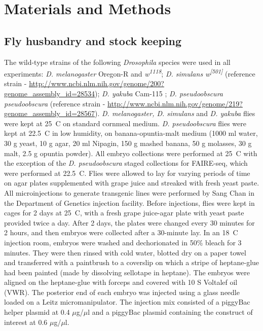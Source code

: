 \chapter{Materials and Methods}

\hrulefill

\section{Fly husbandry and stock keeping}
The wild-type strains of the following \emph{Drosophila} species were used in all experiments: \emph{D. melanogaster} Oregon-R and \emph{w\textsuperscript{1118}}; \emph{D. simulans w\textsuperscript{[501]}} (reference strain - \url{http://www.ncbi.nlm.nih.gov/genome/200?genome_assembly_id=28534}); \emph{D. yakuba} Cam-115 \citep{coyne_genetic_2004}; \emph{D. pseudoobscura pseudoobscura} (reference strain - \url{http://www.ncbi.nlm.nih.gov/genome/219?genome_assembly_id=28567}). \emph{D. melanogaster, D. simulans} and \emph{D. yakuba} flies were kept at 25\degree~C on standard cornmeal medium. \emph{D. pseudoobscura} flies were kept at 22.5\degree~C in low humidity, on banana-opuntia-malt medium (1000 ml water, 30 g yeast, 10 g agar, 20 ml Nipagin, 150 g mashed banana, 50 g molasses, 30 g malt, 2.5 g opuntia powder). All embryo collections were performed at 25\degree~C with the exception of the \emph{D. pseudoobscura} staged collections for FAIRE-seq, which were performed at 22.5\degree~C. Flies were allowed to lay for varying periods of time on agar plates supplemented with grape juice and streaked with fresh yeast paste.\\

All microinjections to generate transgenic lines were performed by Sang Chan in the Department of Genetics injection facility. Before injections, flies were kept in cages for 2 days at 25\degree~C, with a fresh grape juice-agar plate with yeast paste provided twice a day. After 2 days, the plates were changed every 30 minutes for 2 hours, and then embryos were collected after a 30-minute lay. In an 18\degree~C injection room, embryos were washed and dechorionated in 50\% bleach for 3 minutes. They were then rinsed with cold water, blotted dry on a paper towel and transferred with a paintbrush to a coverslip on which a stripe of heptane-glue had been painted (made by dissolving sellotape in heptane). The embryos were aligned on the heptane-glue with forceps and covered with 10 S Voltalef oil (VWR). The posterior end of each embryo was injected using a glass needle loaded on a Leitz micromanipulator. The injection mix consisted of a piggyBac helper plasmid at 0.4 \(\mu\)g/\(\mu\)l and a piggyBac plasmid containing the construct of interest at 0.6 \(\mu\)g/\(\mu\)l.\\

